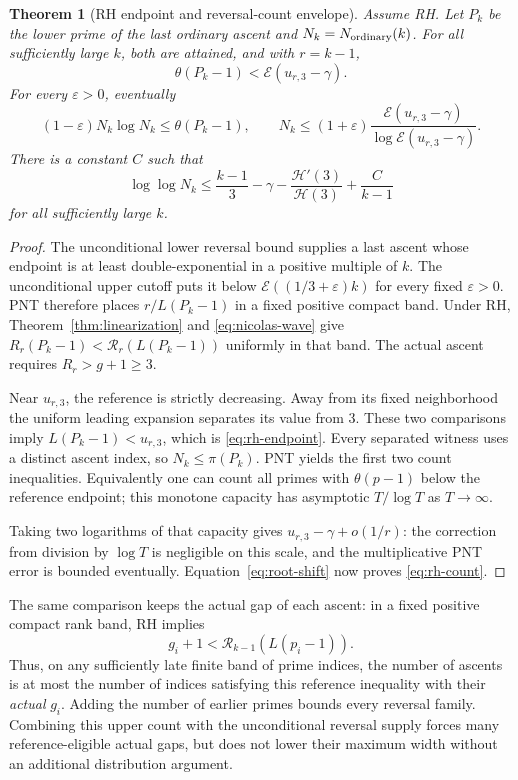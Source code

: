 \documentclass[11pt]{article}
\newtheorem{theorem}{Theorem}[section]
\theoremstyle{definition}
\newcommand{\EE}{\mathcal E}
\begin{document}
\begin{theorem}[RH endpoint and reversal-count envelope]\label{thm:rh-capacity}
Assume RH. Let $P_k$ be the lower prime of the last ordinary ascent
and $N_k=N_{\rm ordinary}(k)$. For all sufficiently large $k$, both
are attained, and with $r=k-1$,
\begin{equation}\label{eq:rh-endpoint}
 \theta(P_k-1)<\EE(u_{r,3}-\gamma).
\end{equation}
For every $\varepsilon>0$, eventually
\[
 (1-\varepsilon)N_k\log N_k\le\theta(P_k-1),\qquad
 N_k\le(1+\varepsilon)
 \frac{\EE(u_{r,3}-\gamma)}
      {\log\EE(u_{r,3}-\gamma)}.
\]
There is a constant $C$ such that
\begin{equation}\label{eq:rh-count}
 \log\log N_k\le
 \frac{k-1}{3}-\gamma-\frac{\mathcal H'(3)}{\mathcal H(3)}
                      +\frac C{k-1}
\end{equation}
for all sufficiently large $k$.
\end{theorem}
\begin{proof}
The unconditional lower reversal bound supplies a last ascent whose
endpoint is at least double-exponential in a positive multiple of
$k$. The unconditional upper cutoff puts it below
$\EE((1/3+\varepsilon)k)$ for every fixed $\varepsilon>0$.
PNT therefore places $r/L(P_k-1)$ in a fixed positive compact band.
Under RH, Theorem~\ref{thm:linearization} and
\eqref{eq:nicolas-wave} give
$R_r(P_k-1)<\mathcal R_r(L(P_k-1))$ uniformly in that band.
The actual ascent requires $R_r>g+1\ge3$.

Near $u_{r,3}$, the reference is strictly decreasing. Away from
its fixed neighborhood the uniform leading expansion separates
its value from $3$. These two comparisons imply
$L(P_k-1)<u_{r,3}$, which is \eqref{eq:rh-endpoint}.
Every separated witness uses a distinct ascent index, so
$N_k\le\pi(P_k)$. PNT yields the first two count inequalities.
Equivalently one can count all primes with $\theta(p-1)$ below
the reference endpoint; this monotone capacity has asymptotic
$T/\log T$ as $T\to\infty$.

Taking two logarithms of that capacity gives
$u_{r,3}-\gamma+o(1/r)$: the correction from division by $\log T$
is negligible on this scale, and the multiplicative PNT error is
bounded eventually. Equation~\eqref{eq:root-shift} now proves
\eqref{eq:rh-count}.
\end{proof}

The same comparison keeps the actual gap of each ascent:
in a fixed positive compact rank band, RH implies
\[
 g_i+1<\mathcal R_{k-1}(L(p_i-1)).
\]
Thus, on any sufficiently late finite band of prime indices, the
number of ascents is at most the number of indices satisfying this
reference inequality with their \emph{actual} $g_i$. Adding the
number of earlier primes bounds every reversal family.
Combining this upper count with the unconditional reversal supply
forces many reference-eligible actual gaps, but does not lower their
maximum width without an additional distribution argument.
\end{document}
